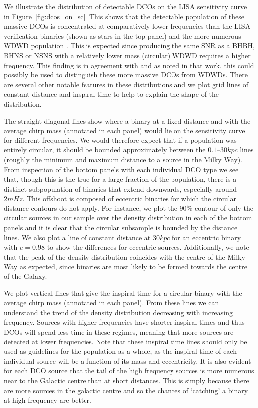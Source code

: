 We illustrate the distribution of detectable DCOs on the LISA sensitivity curve in Figure~\ref{fig:dcos_on_sc}. This shows that the detectable population of these massive DCOs is concentrated at comparatively lower frequencies than the LISA verification binaries (shown as stars in the top panel) and the more numerous WDWD population \citep[e.g.][]{Korol+2017}. This is expected since producing the same SNR as a BHBH, BHNS or NSNS with a relatively lower mass (circular) WDWD requires a higher frequency. This finding is in agreement with \citet{Sesana+2020} and as noted in that work, this could possibly be used to distinguish these more massive DCOs from WDWDs. There are several other notable features in these distributions and we plot grid lines of constant distance and inspiral time to help to explain the shape of the distribution.

The straight diagonal lines show where a binary at a fixed distance and with the average chirp mass (annotated in each panel) would lie on the sensitivity curve for different frequencies. We would therefore expect that if a population was entirely circular, it should be bounded approximately between the $0.1$--$30 \unit{kpc}$ lines (roughly the minimum and maximum distance to a source in the Milky Way). From inspection of the bottom panels with each individual DCO type we see that, though this is the true for a large fraction of the population, there is a distinct subpopulation of binaries that extend downwards, especially around $2 \unit{mHz}$. This offshoot is composed of eccentric binaries for which the circular distance contours do not apply. For instance, we plot the 90\% contour of only the circular sources in our sample over the density distribution in each of the bottom panels and it is clear that the circular subsample is bounded by the distance lines. We also plot a line of constant distance at $30 \unit{kpc}$ for an eccentric binary with $e = 0.98$ to show the differences for eccentric sources. Additionally, we note that the peak of the density distribution coincides with the centre of the Milky Way as expected, since binaries are most likely to be formed towards the centre of the Galaxy.

We plot vertical lines that give the inspiral time for a circular binary with the average chirp mass (annotated in each panel). From these lines we can understand the trend of the density distribution decreasing with increasing frequency. Sources with higher frequencies have shorter inspiral times and thus DCOs will spend less time in these regimes, meaning that more sources are detected at lower frequencies. Note that these inspiral time lines should only be used as guidelines for the population as a whole, as the inspiral time of each individual source will be a function of its mass and eccentricity. It is also evident for each DCO source that the tail of the high frequency sources is more numerous near to the Galactic centre than at short distances. This is simply because there are more sources in the galactic centre and so the chances of `catching' a binary at high frequency are better.

